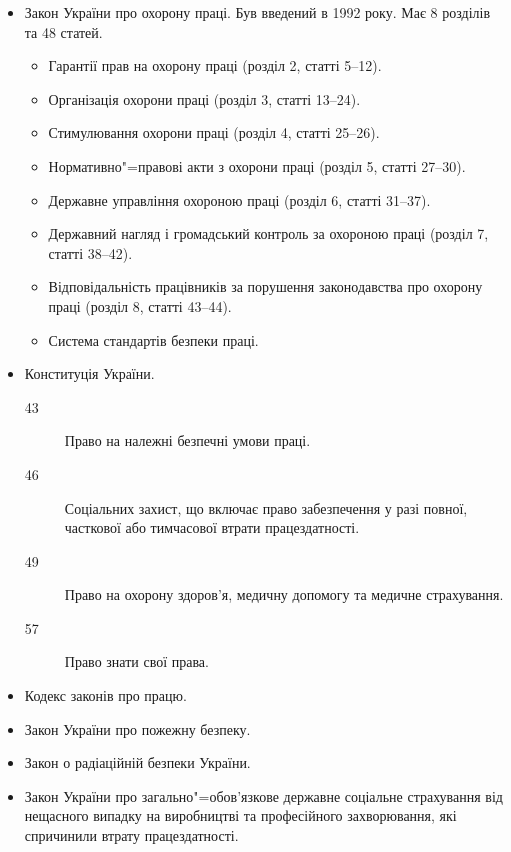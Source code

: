 \documentclass[a4paper,10pt,notitlepage,pdftex,headsepline]{scrartcl}
\begin{document}
  \begin{itemize}
    \item Закон України про охорону праці.
      Був введений в 1992 року.
      Має 8 розділів та 48 статей.
      \begin{itemize}
        \item Гарантії прав на охорону праці (розділ 2, статті 5--12).
        \item Організація охорони праці (розділ 3, статті 13--24).
        \item Стимулювання охорони праці (розділ 4, статті 25--26).
        \item Нормативно"=правові акти з охорони праці (розділ 5, статті
          27--30).
        \item Державне управління охороною праці (розділ 6, статті 31--37).
        \item Державний нагляд і громадський контроль за охороною праці
          (розділ 7, статті 38--42).
        \item Відповідальність працівників за порушення законодавства про
          охорону праці (розділ 8, статті 43--44).
        \item Система стандартів безпеки праці.
      \end{itemize}
    \item Конституція України.
      \begin{description}
        \item[43] Право на належні безпечні умови праці.
        \item[46] Соціальних захист, що включає право забезпечення у разі
          повної, часткової або тимчасової втрати працездатності.
        \item[49] Право на охорону здоров’я, медичну допомогу та медичне
          страхування.
        \item[57] Право знати свої права.
      \end{description}
    \item Кодекс законів про працю.
    \item Закон України про пожежну безпеку.
    \item Закон о радіаційній безпеки України.
    \item Закон України про загально"=обов’язкове державне соціальне страхування
      від нещасного випадку на виробництві та професійного захворювання, які
      спричинили втрату працездатності.
  \end{itemize}
\end{document}
